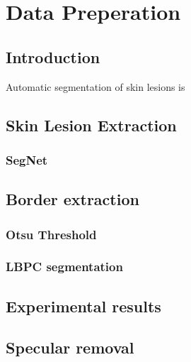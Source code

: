 \chapter{Data Preperation}

\section{Introduction}
Automatic segmentation of skin lesions is 

\section{Skin Lesion Extraction}

\subsection{SegNet}

\section{Border extraction}

\subsection{Otsu Threshold}

\subsection{LBPC segmentation}

\section{Experimental results}

\section{Specular removal}